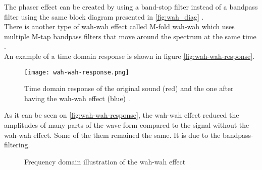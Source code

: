 The phaser effect can be created by using a band-stop filter instead of a bandpass filter using the same block diagram presented in \autoref{fig:wah_diag} \citep{wah-wah_cardiff}. \\

There is another type of wah-wah effect called M-fold wah-wah which uses multiple M-tap bandpass filters that move around the spectrum at the same time \citep{wah-wah_cardiff}. \\

An example of a time domain response is shown in figure \autoref{fig:wah-wah-response}. \\

\begin{figure} [htbp!]
	\centering
	\texttt{[image: wah-wah-response.png]}
	\caption{Time domain response of the original sound (red) and the one after having the wah-wah effect (blue) \citep{wah-wah_cardiff}.}
	\label{fig:wah-wah-response}
\end{figure}


As it can be seen on \autoref{fig:wah-wah-response}, the wah-wah effect reduced the amplitudes of many parts of the wave-form compared to the signal without the wah-wah effect. Some of the them remained the same. It is due to the bandpass-filtering.

\begin{figure}
\centering
\def\svgwidth{\columnwidth}

\caption{Frequency domain illustration of the wah-wah effect}
		\label{fig:wah_wah_frequency}
\end{figure}
